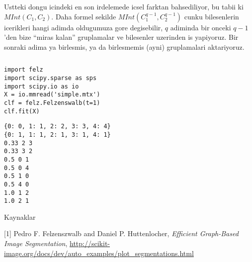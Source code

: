 \documentclass[12pt,fleqn]{article}\usepackage{../common}
\begin{document}
Ustteki dongu icindeki en son irdelemede icsel farktan bahsediliyor, bu
tabii ki $MInt(C_1,C_2)$. Daha formel sekilde $MInt(C_1^{q-1},C_2^{q-1})$
cunku bilesenlerin icerikleri hangi adimda oldugumuza gore degisebilir, $q$
adiminda bir onceki $q-1$'den bize ``miras kalan'' gruplamalar ve
bilesenler uzerinden is yapiyoruz. Bir sonraki adima ya birlesmis, ya da
birlesmemis (ayni) gruplamalari aktariyoruz. 

\inputminted[fontsize=\footnotesize]{python}{felz.py}

\begin{verbatim}
import felz
import scipy.sparse as sps
import scipy.io as io
X = io.mmread('simple.mtx')
clf = felz.Felzenswalb(t=1)
clf.fit(X)
\end{verbatim}

\begin{verbatim}
{0: 0, 1: 1, 2: 2, 3: 3, 4: 4}
{0: 1, 1: 1, 2: 1, 3: 1, 4: 1}
0.33 2 3
0.33 3 2
0.5 0 1
0.5 0 4
0.5 1 0
0.5 4 0
1.0 1 2
1.0 2 1
\end{verbatim}









Kaynaklar

[1] Pedro F. Felzenszwalb and Daniel P. Huttenlocher, {\em Efficient
  Graph-Based Image Segmentation},
\url{http://scikit-image.org/docs/dev/auto_examples/plot_segmentations.html}
\end{document}
